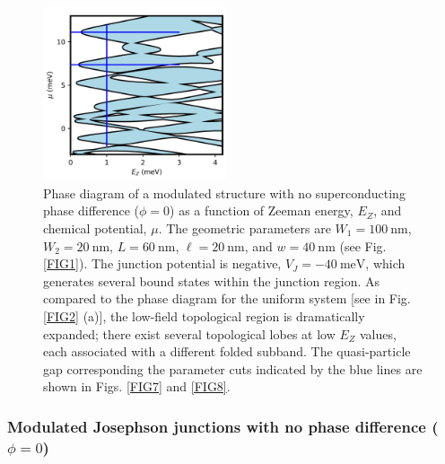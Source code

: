 \documentclass[twocolumn,aps,prb,nofootinbib]{revtex4-2}
\begin{document}
\begin{figure}[t]
\begin{center}
\includegraphics[width=0.48\textwidth]{Fig6.png}
\end{center}
\vspace{-3mm}
\caption{Phase diagram of a modulated structure with no superconducting phase difference ($\phi=0$) as a function of Zeeman energy, $E_Z$, and chemical potential, $\mu$. The geometric parameters are $W_1 = 100~\text{nm}$, $W_2 = 20~\text{nm}$, $L = 60~\text{nm}$, $\ell = 20~\text{nm}$, and $w = 40~\text{nm}$ (see Fig. \ref{FIG1}). The junction potential is negative, $V_J = -40~\text{meV}$,  which generates several bound states within the junction region. As compared to the  phase diagram for the uniform system [see in Fig. \ref{FIG2} (a)], the low-field topological region is dramatically expanded; there exist several topological lobes at low $E_Z$ values, each associated with a different folded subband. The quasi-particle  gap corresponding the parameter cuts  indicated by the blue lines  are shown in Figs. \ref{FIG7} and \ref{FIG8}.}
\label{FIG6}
\vspace{-3mm}
\end{figure}

\subsubsection{Modulated Josephson junctions with no phase difference ($\phi=0$)} \label{phi0}
\end{document}
